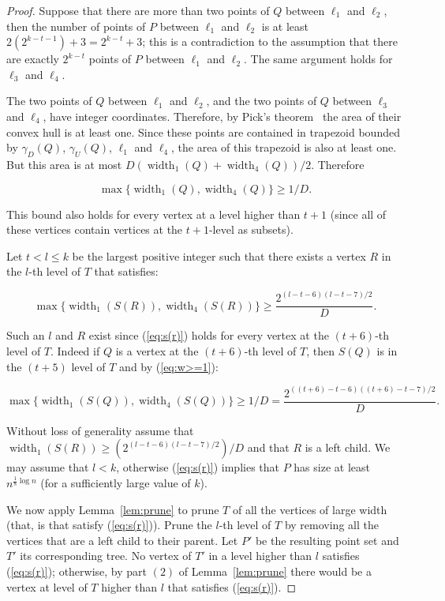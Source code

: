 \documentclass{article}
\begin{document}
\begin{proof}
Suppose that there are more than two points of $Q$ between $\ell_1$ and 
$\ell_2$, then the number of points of $P$ between $\ell_1$ and $\ell_2$ is at least
$2(2^{k-t-1})+3=2^{k-t}+3$; this is a contradiction to the assumption
that there are exactly $2^{k-t}$ points of $P$ between $\ell_1$
and $\ell_2$. The same argument holds for $\ell_3$ and $\ell_4$. 

The two points of $Q$  between $\ell_1$ and $\ell_2$, and the two points 
of $Q$  between $\ell_3$ and $\ell_4$, have integer coordinates. Therefore,
by Pick's theorem~\cite{pick} the area of their convex hull is at least
one. Since these points are contained in trapezoid bounded by $\gamma_D(Q)$, $\gamma_U(Q)$, $\ell_1$
and $\ell_4$, the area of this trapezoid is also at least one. But this area is at most 
$D(\operatorname{width}_1(Q)+\operatorname{width}_4(Q))/2$. Therefore

\begin{equation} \label{eq:w>=1}
 \max\{\operatorname{width}_1(Q),\operatorname{width}_4(Q)\} \ge 1/D.
\end{equation}

This bound also holds for every vertex at a level higher than $t+1$ 
(since all of these vertices contain vertices at the $t+1$-level as subsets).

Let $t < l \le k$ be the largest positive integer  such that
there exists a vertex $R$ in the $l$-th level of $T$ that satisfies:

\begin{equation}\label{eq:s(r)}
\max\{\operatorname{width}_1(S(R)),\operatorname{width}_4(S(R))\} \ge \frac{2^{(l-t-6)(l-t-7)/2}}{D}.
\end{equation}

Such an $l$ and $R$ exist since (\ref{eq:s(r)}) holds 
for every vertex at the $(t+6)$-th level of $T$. Indeed
if $Q$ is a vertex at the $(t+6)$-th level of $T$, then 
$S(Q)$ is in the $(t+5)$ level of $T$ and by (\ref{eq:w>=1}):

\[\max\{\operatorname{width}_1(S(Q)),\operatorname{width}_4(S(Q))\} \ge 1/D=\frac{2^{((t+6)-t-6)((t+6)-t-7)/2}}{D}.\]

Without loss of generality assume that 
$\operatorname{width}_1(S(R)) \ge (2^{(l-t-6)(l-t-7)/2})/D$ and that $R$ is a left
child.
We may assume that $l<k$, otherwise (\ref{eq:s(r)}) implies that $P$ has size at least 
$n^{\frac{1}{8}\log n}$ (for a sufficiently large value of $k$). 

We now apply Lemma~\ref{lem:prune} to prune $T$ of all the vertices
of large width (that, is that satisfy (\ref{eq:s(r)})).
Prune the $l$-th level of $T$ by removing all the vertices that are a left
child to their parent. Let $P'$ be the resulting point set
and $T'$ its corresponding tree. No vertex of $T'$ in a level higher than $l$ satisfies (\ref{eq:s(r)});
otherwise, by part $(2)$ of Lemma~\ref{lem:prune} there would be a vertex
at level of $T$ higher than $l$ that satisfies (\ref{eq:s(r)}). 


\end{proof}
\end{document}
